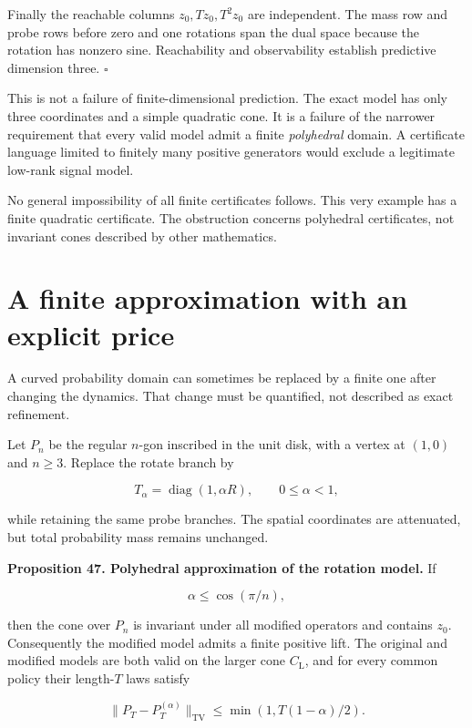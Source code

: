 Finally the reachable columns \(z_0,Tz_0,T^2z_0\) are independent. The
mass row and probe rows before zero and one rotations span the dual
space because the rotation has nonzero sine. Reachability and
observability establish predictive dimension three. \(\square\)

This is not a failure of finite-dimensional prediction. The exact model
has only three coordinates and a simple quadratic cone. It is a failure
of the narrower requirement that every valid model admit a finite
\emph{polyhedral} domain. A certificate language limited to finitely
many positive generators would exclude a legitimate low-rank signal
model.

No general impossibility of all finite certificates follows. This very
example has a finite quadratic certificate. The obstruction concerns
polyhedral certificates, not invariant cones described by other
mathematics.

\section{A finite approximation with an explicit price}\label{LSM:a-finite-approximation-with-an-explicit-price}

A curved probability domain can sometimes be replaced by a finite one
after changing the dynamics. That change must be quantified, not
described as exact refinement.

Let \(P_n\) be the regular \(n\)-gon inscribed in the unit disk, with a
vertex at \((1,0)\) and \(n\geq3\). Replace the rotate branch by

\[
T_\alpha=\operatorname{diag}(1,\alpha R),\qquad 0\leq\alpha<1,
\]

while retaining the same probe branches. The spatial coordinates are
attenuated, but total probability mass remains unchanged.

\textbf{Proposition 47. Polyhedral approximation of the rotation model.}
If

\[
\alpha\leq\cos(\pi/n),
\]

then the cone over \(P_n\) is invariant under all modified operators and
contains \(z_0\). Consequently the modified model admits a finite
positive lift. The original and modified models are both valid on the
larger cone \(C_{\mathrm L}\), and for every common policy their
length-\(T\) laws satisfy

\[
\boxed{\|P_T-P_T^{(\alpha)}\|_{\mathrm{TV}}
\leq\min(1,T(1-\alpha)/2).}
\]


